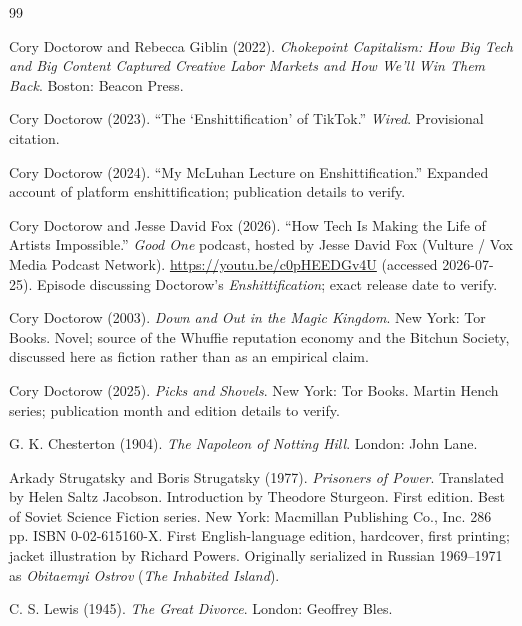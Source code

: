 \documentclass[11pt]{article}
\begin{document}
\begin{thebibliography}{99}

Cory Doctorow and Rebecca Giblin (2022). \emph{Chokepoint Capitalism: How Big Tech and Big Content Captured Creative Labor Markets and How We'll Win Them Back}. Boston: Beacon Press.

Cory Doctorow (2023). ``The `Enshittification' of TikTok.'' \emph{Wired}. Provisional citation.

Cory Doctorow (2024). ``My McLuhan Lecture on Enshittification.'' Expanded account of platform enshittification; publication details to verify.

Cory Doctorow and Jesse David Fox (2026). ``How Tech Is Making the Life of Artists Impossible.'' \emph{Good One} podcast, hosted by Jesse David Fox (Vulture / Vox Media Podcast Network). \url{https://youtu.be/c0pHEEDGv4U} (accessed 2026-07-25). Episode discussing Doctorow's \emph{Enshittification}; exact release date to verify.

Cory Doctorow (2003). \emph{Down and Out in the Magic Kingdom}. New York: Tor Books. Novel; source of the Whuffie reputation economy and the Bitchun Society, discussed here as fiction rather than as an empirical claim.

Cory Doctorow (2025). \emph{Picks and Shovels}. New York: Tor Books. Martin Hench series; publication month and edition details to verify.

G. K. Chesterton (1904). \emph{The Napoleon of Notting Hill}. London: John Lane.

Arkady Strugatsky and Boris Strugatsky (1977). \emph{Prisoners of Power}. Translated by Helen Saltz Jacobson. Introduction by Theodore Sturgeon. First edition. Best of Soviet Science Fiction series. New York: Macmillan Publishing Co., Inc. 286 pp. ISBN 0-02-615160-X. First English-language edition, hardcover, first printing; jacket illustration by Richard Powers. Originally serialized in Russian 1969--1971 as \emph{Obitaemyi Ostrov} (\emph{The Inhabited Island}).

C. S. Lewis (1945). \emph{The Great Divorce}. London: Geoffrey Bles.


\end{thebibliography}
\end{document}
